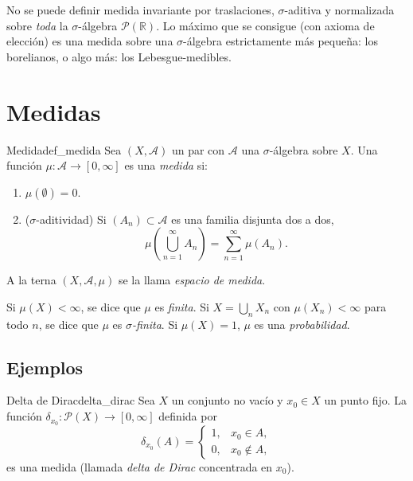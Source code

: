 \documentclass[11pt, a4paper]{article}
\begin{document}
\obs No se puede definir medida invariante por traslaciones, $\sigma$-aditiva y
normalizada sobre \emph{toda} la $\sigma$-álgebra $\mathcal{P}(\mathbb{R})$. Lo máximo que se
consigue (con axioma de elección) es una medida sobre una $\sigma$-álgebra estrictamente
más pequeña: los borelianos, o algo más: los Lebesgue-medibles.

\newpage

\section{Medidas}

\begin{definicion}{Medida}{def_medida}
Sea $(X, \mathcal{A})$ un par con $\mathcal{A}$ una $\sigma$-álgebra sobre $X$. Una función
$\mu: \mathcal{A} \to [0, \infty]$ es una \emph{medida} si:
\begin{enumerate}
    \item $\mu(\emptyset) = 0$.
    \item ($\sigma$-aditividad) Si $(A_n) \subset \mathcal{A}$ es una familia disjunta dos a dos,
    $$ \mu\!\left(\bigcup_{n=1}^\infty A_n\right) = \sum_{n=1}^\infty \mu(A_n). $$
\end{enumerate}
A la terna $(X, \mathcal{A}, \mu)$ se la llama \emph{espacio de medida}.

Si $\mu(X) < \infty$, se dice que $\mu$ es \emph{finita}. Si $X = \bigcup_n X_n$ con
$\mu(X_n) < \infty$ para todo $n$, se dice que $\mu$ es \emph{$\sigma$-finita}. Si $\mu(X) = 1$,
$\mu$ es una \emph{probabilidad}.
\end{definicion}

\subsection{Ejemplos}

\begin{proposicion}{Delta de Dirac}{delta_dirac}
Sea $X$ un conjunto no vacío y $x_0 \in X$ un punto fijo. La función $\delta_{x_0}:
\mathcal{P}(X) \to [0, \infty]$ definida por
$$ \delta_{x_0}(A) = \begin{cases} 1, & x_0 \in A, \\ 0, & x_0 \notin A, \end{cases} $$
es una medida (llamada \emph{delta de Dirac} concentrada en $x_0$).
\end{proposicion}
\end{document}
